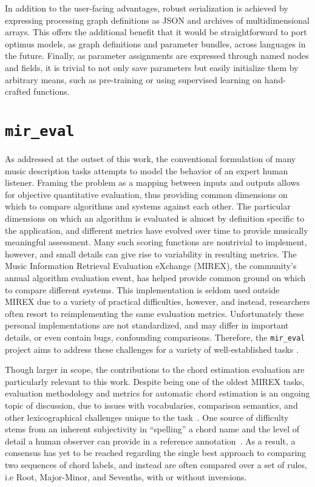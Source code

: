 In addition to the user-facing advantages, robust serialization is achieved by expressing processing graph definitions as JSON and archives of multidimensional arrays.
This offers the additional benefit that it would be straightforward to port optimus models, as graph definitions and parameter bundles, across languages in the future.
Finally, as parameter assignments are expressed through named nodes and fields, it is trivial to not only save parameters but easily initialize them by arbitrary means, such as pre-training or using supervised learning on hand-crafted functions.


\section{\texttt{mir\_eval}}
\label{sec:mir_eval}

As addressed at the outset of this work, the conventional formulation of many music description tasks attempts to model the behavior of an expert human listener.
Framing the problem as a mapping between inputs and outputs allows for objective quantitative evaluation, thus providing common dimensions on which to compare algorithms and systems against each other.
The particular dimensions on which an algorithm is evaluated is almost by definition specific to the application, and different metrics have evolved over time to provide musically meaningful assessment.
Many such scoring functions are nontrivial to implement, however, and small details can give rise to variability in resulting metrics.
The Music Information Retrieval Evaluation eXchange (MIREX), the community's annual algorithm evaluation event, has helped provide common ground on which to compare different systems.
This implementation is seldom used outside MIREX due to a variety of practical difficulties, however, and instead, researchers often resort to reimplementing the same evaluation metrics.
Unfortunately these personal implementations are not standardized, and may differ in important details, or even contain bugs, confounding comparisons.
Therefore, the \texttt{mir\_eval} project aims to address these challenges for a variety of well-established tasks \cite{Raffel2014}.


Though larger in scope, the contributions to the chord estimation evaluation are particularly relevant to this work.
Despite being one of the oldest MIREX tasks, evaluation methodology and metrics for automatic chord estimation is an ongoing topic of discussion, due to issues with vocabularies, comparison semantics, and other lexicographical challenges unique to the task~\cite{pauwels2013evaluating}.
One source of difficulty stems from an inherent subjectivity in ``spelling'' a chord name and the level of detail a human observer can provide in a reference annotation~\cite{ni2013understanding}.
As a result, a consensus has yet to be reached regarding the single best approach to comparing two sequences of chord labels, and instead are often compared over a set of rules, i.e Root, Major-Minor, and Sevenths, with or without inversions.

